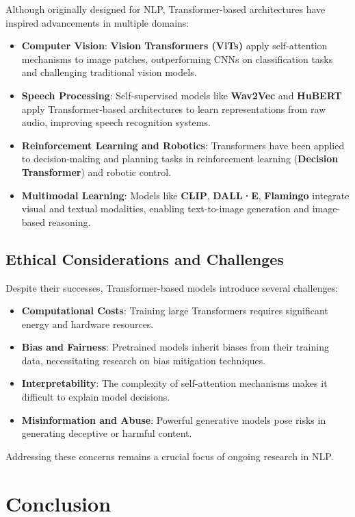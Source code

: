 Although originally designed for NLP, Transformer-based architectures have inspired advancements in multiple domains:

\begin{itemize}
    \item \textbf{Computer Vision}: \textbf{Vision Transformers (ViTs)} apply self-attention mechanisms to image patches, outperforming CNNs on classification tasks and challenging traditional vision models.
    \item \textbf{Speech Processing}: Self-supervised models like \textbf{Wav2Vec} and \textbf{HuBERT} apply Transformer-based architectures to learn representations from raw audio, improving speech recognition systems.
    \item \textbf{Reinforcement Learning and Robotics}: Transformers have been applied to decision-making and planning tasks in reinforcement learning (\textbf{Decision Transformer}) and robotic control.
    \item \textbf{Multimodal Learning}: Models like \textbf{CLIP}, \textbf{DALL·E}, \textbf{Flamingo} integrate visual and textual modalities, enabling text-to-image generation and image-based reasoning.
\end{itemize}

\subsection{Ethical Considerations and Challenges}

Despite their successes, Transformer-based models introduce several challenges:
\begin{itemize}
    \item \textbf{Computational Costs}: Training large Transformers requires significant energy and hardware resources.
    \item \textbf{Bias and Fairness}: Pretrained models inherit biases from their training data, necessitating research on bias mitigation techniques.
    \item \textbf{Interpretability}: The complexity of self-attention mechanisms makes it difficult to explain model decisions.
    \item \textbf{Misinformation and Abuse}: Powerful generative models pose risks in generating deceptive or harmful content.
\end{itemize}

Addressing these concerns remains a crucial focus of ongoing research in NLP.

\section{Conclusion}

